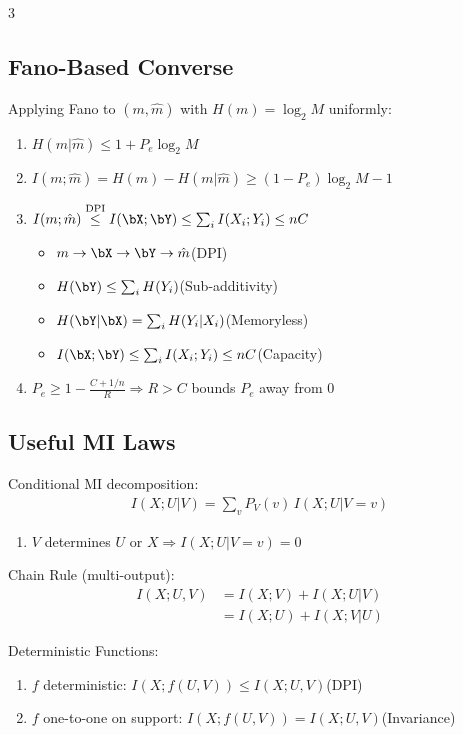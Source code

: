 \documentclass[12pt, a4paper]{article}
\begin{document}
\begin{multicols*}{3}
\subsection{Fano-Based Converse}
Applying Fano to $(m,\hat m)$ with $H(m)=\log_2 M$ uniformly:
\begin{enumerate}[\roman*.]
  \item $H(m|\hat m)\le 1+P_e\log_2M$
  \item $I(m;\hat m)=H(m)-H(m|\hat m)\ge (1-P_e)\log_2M - 1$ 
  \item $I(m;\hat m)\overset{\text{DPI}}\le I(\bX;\bY)\le\sum_i I(X_i;Y_i)\le nC$
    \begin{itemize}[leftmargin=*]\vspace{3pt}
      \item $m\to\bX\to\bY\to\hat m$\hfill(DPI)
      \item $H(\bY)\le\sum_i H(Y_i)$\hfill(Sub-additivity)
      \item $H(\bY|\bX)=\sum_i H(Y_i|X_i)$\hfill(Memoryless)
      \item $I(\bX;\bY)\le\sum_i I(X_i;Y_i)\le nC$\hfill(Capacity)
    \end{itemize}
  \item $P_e\ge 1-\tfrac{C+1/n}{R}\Rightarrow R>C$ bounds $P_e$ away from $0$
\end{enumerate}
\colbreak
\subsection{Useful MI Laws}
Conditional MI decomposition:
\begin{align*}
  I(X;U|V)=\sum_v P_V(v)\,I(X;U|V=v)
\end{align*}
\begin{enumerate}[\roman*.]
  \item $V$ determines $U$ or $X\Rightarrow I(X;U|V=v)=0$
\end{enumerate}
 
Chain Rule (multi-output):
\begin{align*}
  I(X;U,V)&=I(X;V)+I(X;U|V)\\&=I(X;U)+I(X;V|U)
\end{align*}
 
Deterministic Functions:
\begin{enumerate}[\roman*.]
  \item $f$ deterministic: $I(X;f(U,V))\le I(X;U,V)$\hfill(DPI)
  \item $f$ one-to-one on support: $I(X;f(U,V))=I(X;U,V)$\hfill(Invariance)
\end{enumerate}
 

\end{multicols*}
\end{document}

